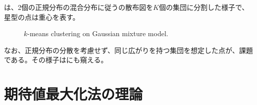 \documentclass[10pt,a4paper]{book}
\begin{document}
は、2個の正規分布の混合分布に従うの散布図を$K$個の集団に分割した様子で、星型の点は重心を表す。

\begin{figure}[h]
\centering
{}
\caption{$k$-means clustering on Gaussian mixture model.\label{fig:kmean}}
\end{figure}

なお、正規分布の分散を考慮せず、同じ広がりを持つ集団を想定した点が、課題である。その様子はにも窺える。

\section{期待値最大化法の理論\label{sect:em}}
\end{document}

